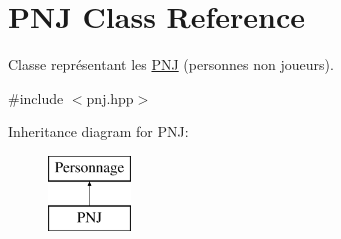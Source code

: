 \hypertarget{class_p_n_j}{\section{P\-N\-J Class Reference}
\label{class_p_n_j}
}


Classe représentant les \hyperlink{class_p_n_j}{P\-N\-J} (personnes non joueurs).  




{\ttfamily \#include $<$pnj.\-hpp$>$}

Inheritance diagram for P\-N\-J\-:\begin{figure}[H]
\begin{center}
\leavevmode
\includegraphics[height=2.000000cm]{class_p_n_j}
\end{center}
\end{figure}
